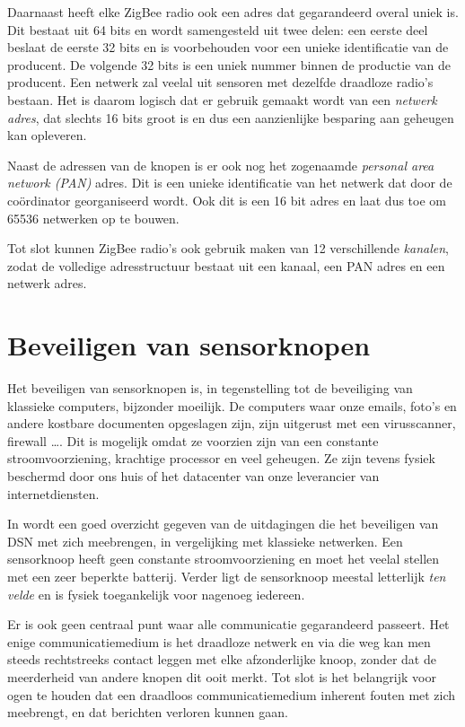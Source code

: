 Daarnaast heeft elke ZigBee radio ook een adres dat gegarandeerd overal uniek
is. Dit bestaat uit 64 bits en wordt samengesteld uit twee delen: een eerste
deel beslaat de eerste 32 bits en is voorbehouden voor een unieke identificatie
van de producent. De volgende 32 bits is een uniek nummer binnen de productie
van de producent. Een netwerk zal veelal uit sensoren met dezelfde draadloze
radio's bestaan. Het is daarom logisch dat er gebruik gemaakt wordt van een
\emph{netwerk adres}, dat slechts 16 bits groot is en dus een aanzienlijke
besparing aan geheugen kan opleveren.

Naast de adressen van de knopen is er ook nog het zogenaamde \emph{personal
area network (PAN)} adres. Dit is een unieke identificatie van het netwerk dat
door de co\"ordinator georganiseerd wordt. Ook dit is een 16 bit adres en laat
dus toe om 65536 netwerken op te bouwen.

Tot slot kunnen ZigBee radio's ook gebruik maken van 12 verschillende
\emph{kanalen}, zodat de volledige adresstructuur bestaat uit een kanaal, een
PAN adres en een netwerk adres.

\section{Beveiligen van sensorknopen}
\label{section:beveiligen}

Het beveiligen van sensorknopen is, in tegenstelling tot de beveiliging van
klassieke computers, bijzonder moeilijk. De computers waar onze emails, foto's
en andere kostbare documenten opgeslagen zijn, zijn uitgerust met een
virusscanner, firewall \dots. Dit is mogelijk omdat ze voorzien zijn van een
constante stroomvoorziening, krachtige processor en veel geheugen. Ze zijn
tevens fysiek beschermd door ons huis of het datacenter van onze leverancier
van internetdiensten.

In \citep{dargie2010fundamentals} wordt een goed overzicht gegeven van de
uitdagingen die het beveiligen van DSN met zich meebrengen, in vergelijking met
klassieke netwerken. Een sensorknoop heeft geen constante stroomvoorziening en
moet het veelal stellen met een zeer beperkte batterij. Verder ligt de
sensorknoop meestal letterlijk \emph{ten velde} en is fysiek toegankelijk voor
nagenoeg iedereen.

Er is ook geen centraal punt waar alle communicatie gegarandeerd passeert. Het
enige communicatiemedium is het draadloze netwerk en via die weg kan men steeds
rechtstreeks contact leggen met elke afzonderlijke knoop, zonder dat de
meerderheid van andere knopen dit ooit merkt. Tot slot is het belangrijk voor
ogen te houden dat een draadloos communicatiemedium inherent fouten met zich
meebrengt, en dat berichten verloren kunnen gaan.

